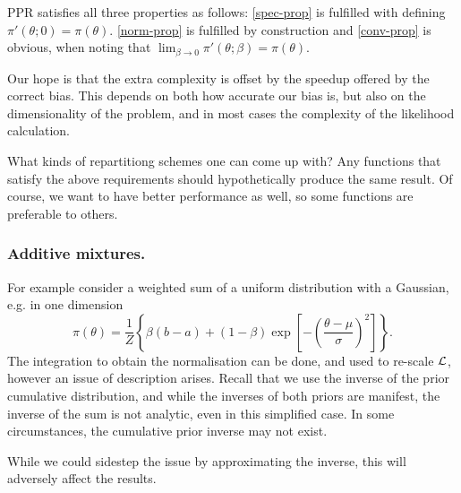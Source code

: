 \documentclass[usenatbib]{mnras}
\begin{document}
PPR satisfies all three properties as follows: \ref{spec-prop} is
fulfilled with defining \(\pi'(\theta; 0) =
   \pi(\theta)\). \ref{norm-prop} is fulfilled by construction and
\ref{conv-prop} is obvious, when noting that \(\lim_{\beta
   \rightarrow 0} \pi'(\theta; \beta) = \pi(\theta)\).

Our hope is that the extra complexity is offset by the speedup
offered by the correct bias. This depends on both how accurate our
bias is, but also on the dimensionality of the problem, and in most
cases the complexity of the likelihood calculation. 

What kinds of repartitiong schemes one can come up with? Any
functions that satisfy the above requirements should hypothetically
produce the same result. Of course, we want to have better
performance as well, so some functions are preferable to others. 

\subsubsection{Additive mixtures.}
\label{sec:org3d52ccf}
For example consider a weighted sum of a uniform distribution with
a Gaussian, e.g. in one dimension
\begin{equation}
  \pi(\theta) = \frac{1}{Z} \left\lbrace \beta (b - a) + (1-\beta) \exp \left[ -\left(\frac{\theta - \mu}{\sigma} \right)^{2}\right]\right\rbrace.
\end{equation}
The integration to obtain the normalisation can be done, and used
to re-scale \({\cal L}\), however an issue of description
arises. Recall that we use the inverse of the prior cumulative
distribution, and while the inverses of both priors are manifest,
the inverse of the sum is not analytic, even in this simplified
case. In some circumstances, the cumulative prior inverse may not
exist. 

While we could sidestep the issue by approximating the inverse,
this will adversely affect the results.

\end{document}
